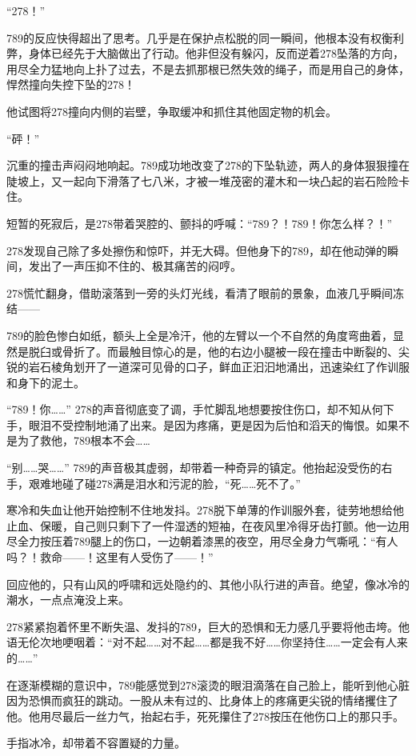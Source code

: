 \documentclass[a4paper]{book}
\begin{document}
“278！”

789的反应快得超出了思考。几乎是在保护点松脱的同一瞬间，他根本没有权衡利弊，身体已经先于大脑做出了行动。他非但没有躲闪，反而逆着278坠落的方向，用尽全力猛地向上扑了过去，不是去抓那根已然失效的绳子，而是用自己的身体，悍然撞向失控下坠的278！

他试图将278撞向内侧的岩壁，争取缓冲和抓住其他固定物的机会。

“砰！”

沉重的撞击声闷闷地响起。789成功地改变了278的下坠轨迹，两人的身体狠狠撞在陡坡上，又一起向下滑落了七八米，才被一堆茂密的灌木和一块凸起的岩石险险卡住。

短暂的死寂后，是278带着哭腔的、颤抖的呼喊：“789？！789！你怎么样？！”

278发现自己除了多处擦伤和惊吓，并无大碍。但他身下的789，却在他动弹的瞬间，发出了一声压抑不住的、极其痛苦的闷哼。

278慌忙翻身，借助滚落到一旁的头灯光线，看清了眼前的景象，血液几乎瞬间冻结——

789的脸色惨白如纸，额头上全是冷汗，他的左臂以一个不自然的角度弯曲着，显然是脱臼或骨折了。而最触目惊心的是，他的右边小腿被一段在撞击中断裂的、尖锐的岩石棱角划开了一道深可见骨的口子，鲜血正汩汩地涌出，迅速染红了作训服和身下的泥土。

“789！你……” 278的声音彻底变了调，手忙脚乱地想要按住伤口，却不知从何下手，眼泪不受控制地涌了出来。是因为疼痛，更是因为后怕和滔天的悔恨。如果不是为了救他，789根本不会……

“别……哭……” 789的声音极其虚弱，却带着一种奇异的镇定。他抬起没受伤的右手，艰难地碰了碰278满是泪水和污泥的脸，“死……死不了。”

寒冷和失血让他开始控制不住地发抖。278脱下单薄的作训服外套，徒劳地想给他止血、保暖，自己则只剩下了一件湿透的短袖，在夜风里冷得牙齿打颤。他一边用尽全力按压着789腿上的伤口，一边朝着漆黑的夜空，用尽全身力气嘶吼：“有人吗？！救命——！这里有人受伤了——！”

回应他的，只有山风的呼啸和远处隐约的、其他小队行进的声音。绝望，像冰冷的潮水，一点点淹没上来。

278紧紧抱着怀里不断失温、发抖的789，巨大的恐惧和无力感几乎要将他击垮。他语无伦次地哽咽着：“对不起……对不起……都是我不好……你坚持住……一定会有人来的……”

在逐渐模糊的意识中，789能感觉到278滚烫的眼泪滴落在自己脸上，能听到他心脏因为恐惧而疯狂的跳动。一股从未有过的、比身体上的疼痛更尖锐的情绪攫住了他。他用尽最后一丝力气，抬起右手，死死攥住了278按压在他伤口上的那只手。

手指冰冷，却带着不容置疑的力量。
\end{document}
